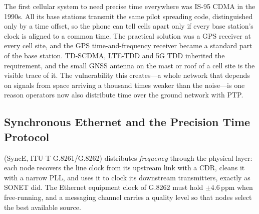 

\begin{history}
The first cellular system to need precise time everywhere was IS-95 CDMA in the 1990s. All its base
stations transmit the same pilot spreading code, distinguished only by a time offset, so the phone
can tell cells apart only if every base station's clock is aligned to a common time. The
practical solution was a GPS receiver at every cell site, and the GPS time-and-frequency receiver
became a standard part of the base station. TD-SCDMA, LTE-TDD and 5G TDD inherited the requirement,
and the small GNSS antenna on the mast or roof of a cell site is the visible trace of it. The
vulnerability this creates---a whole network that depends on signals from space arriving a thousand
times weaker than the noise---is one reason operators now also distribute time over the ground
network with PTP.
\end{history}

\subsection{Synchronous Ethernet and the Precision Time Protocol}

 (SyncE, ITU-T G.8261/G.8262) distributes \emph{frequency} through the
physical layer: each node recovers the line clock from its upstream link with a CDR, cleans it with a
narrow PLL, and uses it to clock its downstream transmitters, exactly as SONET did. The Ethernet
equipment clock of G.8262 must hold $\pm4.6$\,ppm when free-running, and a messaging channel carries a
quality level so that nodes select the best available source.

